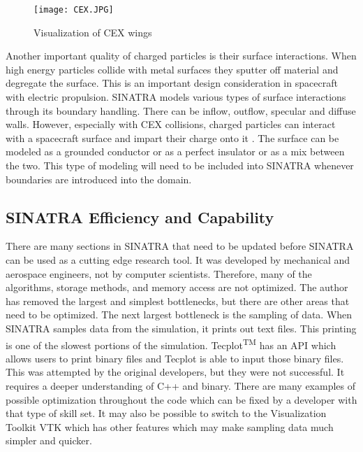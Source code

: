 \begin{figure}
\texttt{[image: CEX.JPG]}
\centering
\caption[Visualization of CEX wings]{Visualization of CEX wings \textmd{\cite{cex_wings}}}
\label{fig:CEX}
\end{figure}

\indent Another important quality of charged particles is their surface interactions. When high energy particles collide with metal surfaces they sputter off material and degregate the surface. This is an important design consideration in spacecraft with electric propulsion. SINATRA models various types of surface interactions through its boundary handling. There can be inflow, outflow, specular and diffuse walls. However, especially with CEX collisions, charged particles can interact with a spacecraft surface and impart their charge onto it \cite{surface_charge}. The surface can be modeled as a grounded conductor or as a perfect insulator or as a mix between the two. This type of modeling will need to be included into SINATRA whenever boundaries are introduced into the domain.

\subsection{SINATRA Efficiency and Capability}
\label{sec:auto_mesh}
There are many sections in SINATRA that need to be updated before SINATRA can be used as a cutting edge research tool. It was developed by mechanical and aerospace engineers, not by computer scientists. Therefore, many of the algorithms, storage methods, and memory access are not optimized. The author has removed the largest and simplest bottlenecks, but there are other areas that need to be optimized. The next largest bottleneck is the sampling of data. When SINATRA samples data from the simulation, it prints out text files. This printing is one of the slowest portions of the simulation. Tecplot\textsuperscript{TM} has an API which allows users to print binary files and Tecplot is able to input those binary files. This was attempted by the original developers, but they were not successful. It requires a deeper understanding of C++ and binary. There are many examples of possible optimization throughout the code which can be fixed by a developer with that type of skill set. It may also be possible to switch to the Visualization Toolkit VTK which has other features which may make sampling data much simpler and quicker. \par


